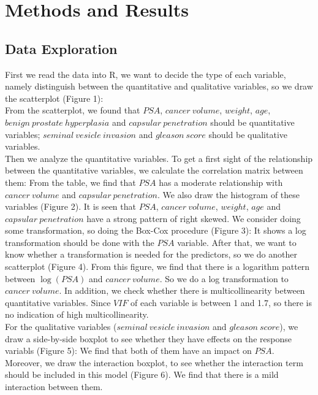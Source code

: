 \documentclass[12pt, letterpaper]{article}
\begin{document}
\section{Methods and Results}

  \subsection{Data Exploration}

    First we read the data into R, we want to decide the type of each variable, namely distinguish between the quantitative and qualitative variables, so we draw the scatterplot (Figure 1):\\

    From the scatterplot, we found that $PSA$, $cancer~volume$, $weight$, $age$, $benign~prostate~hyperplasia$ and $capsular~penetration$ should be quantitative variables; $seminal~vesicle~invasion$ and $gleason~score$ should be qualitative variables.\\

    Then we analyze the quantitative variables. To get a first sight of the relationship between the quantitative variables, we calculate the correlation matrix between them: From the table, we find that $PSA$ has a moderate relationship with $cancer~volume$ and $capsular~penetration$. We also draw the histogram of these variables (Figure 2). It is seen that $PSA$, $cancer~volume$, $weight$, $age$ and $capsular~penetration$ have a strong pattern of right skewed. We consider doing some transformation, so doing the Box-Cox procedure (Figure 3): It shows a log transformation should be done with the $PSA$ variable. After that, we want to know whether a transformation is needed for the predictors, so we do another scatterplot (Figure 4). From this figure, we find that there is a logarithm pattern between $\log(PSA)$ and $cancer~volume$. So we do a log transformation to $cancer~volume$. In addition, we check whether there is multicollinearity between quantitative variables. Since $VIF$ of each variable is between 1 and 1.7, so there is no indication of high multicollinearity.\\

    For the qualitative variables ($seminal~vesicle~invasion$ and $gleason~score$), we draw a side-by-side boxplot to see whether they have effects on the response variabls (Figure 5): We find that both of them have an impact on $PSA$. Moreover, we draw the interaction boxplot, to see whether the interaction term should be included in this model (Figure 6). We find that there is a mild interaction between them.\\
\end{document}
